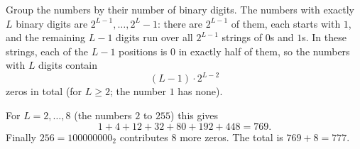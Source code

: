Group the numbers by their number of binary digits. The numbers with exactly $L$ binary digits are $2^{L-1},\dots,2^L-1$: there are $2^{L-1}$ of them, each starts with $1$, and the remaining $L-1$ digits run over all $2^{L-1}$ strings of $0$s and $1$s. In these strings, each of the $L-1$ positions is $0$ in exactly half of them, so the numbers with $L$ digits contain
\[
(L-1)\cdot2^{L-2}
\]
zeros in total (for $L\ge2$; the number $1$ has none).

For $L=2,\dots,8$ (the numbers $2$ to $255$) this gives
\[
1+4+12+32+80+192+448=769 .
\]
Finally $256=100000000_2$ contributes $8$ more zeros. The total is $769+8=\boxed{777}$.
